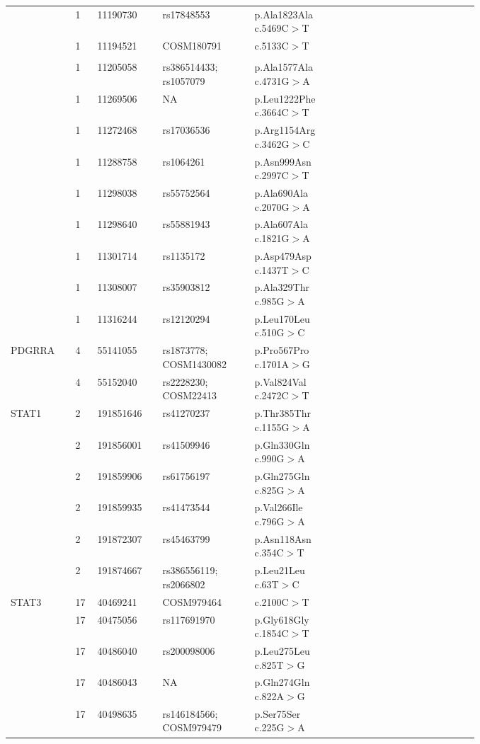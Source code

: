\begin{longtable}{p{0.1\linewidth}|p{0.02\linewidth}p{0.1\linewidth}p{0.16\linewidth}p{0.15\linewidth}p{0.08\linewidth}p{0.08\linewidth}p{0.08\linewidth}}
		& 1 & 11190730 & rs17848553 & p.Ala1823Ala c.5469C$>$T & & &
		\\
		& 1 & 11194521 & COSM180791 & c.5133C$>$T & & &
		\\
		\\
		& 1 & 11205058 & rs386514433; rs1057079 & p.Ala1577Ala c.4731G$>$A & & &
		\\
		& 1 & 11269506 & NA & p.Leu1222Phe c.3664C$>$T & & &
		\\
		& 1 & 11272468 & rs17036536 & p.Arg1154Arg c.3462G$>$C & & &
		\\
		& 1 & 11288758 & rs1064261 & p.Asn999Asn c.2997C$>$T & & &
		\\
		& 1 & 11298038 & rs55752564 & p.Ala690Ala c.2070G$>$A & & &
		\\
		& 1 & 11298640 & rs55881943 & p.Ala607Ala c.1821G$>$A & & &
		\\
		& 1 & 11301714 & rs1135172 & p.Asp479Asp c.1437T$>$C & & &
		\\
		& 1 & 11308007 & rs35903812 & p.Ala329Thr c.985G$>$A & & &
		\\
		& 1 & 11316244 & rs12120294 & p.Leu170Leu c.510G$>$C & & &
		\\
		\hline
		PDGRRA & 4 & 55141055 & rs1873778; COSM1430082 & p.Pro567Pro c.1701A$>$G & & &
		\\
		& 4 & 55152040 & rs2228230; COSM22413 & p.Val824Val c.2472C$>$T & & &
		\\
		\hline
		STAT1 & 2 & 191851646 & rs41270237 & p.Thr385Thr c.1155G$>$A & & &
		\\
		& 2 & 191856001 & rs41509946 & p.Gln330Gln c.990G$>$A & & &
		\\
		& 2 & 191859906 & rs61756197 & p.Gln275Gln c.825G$>$A & & &
		\\
		& 2 & 191859935 & rs41473544 & p.Val266Ile c.796G$>$A & & &
		\\
		& 2 & 191872307 & rs45463799 & p.Asn118Asn c.354C$>$T & & &
		\\
		& 2 & 191874667 & rs386556119; rs2066802 & p.Leu21Leu c.63T$>$C & & &
		\\
		\hline
		STAT3 & 17 & 40469241 & COSM979464 & c.2100C$>$T & & &
		\\
		& 17 & 40475056 & rs117691970 & p.Gly618Gly c.1854C$>$T & & &
		\\
		& 17 & 40486040 & rs200098006 & p.Leu275Leu c.825T$>$G & & &
		\\
		& 17 & 40486043 & NA & p.Gln274Gln c.822A$>$G & & &
		\\
		& 17 & 40498635 & rs146184566; COSM979479 & p.Ser75Ser c.225G$>$A & & &

\end{longtable}

